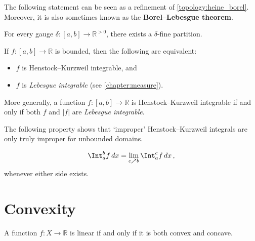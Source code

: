     The following statement can be seen as a refinement of \cref{topology:heine_borel}. Moreover, it is also sometimes known as the \textbf{Borel--Lebesgue theorem}.
    \begin{property}[Cousin]
        For every gauge $\delta:[a,b]\rightarrow\mathbb{R}^{>0}$, there exists a $\delta$-fine partition. 
    \end{property}

    \begin{property}[Integrability]
        If $f:[a,b]\rightarrow\mathbb{R}$ is bounded, then the following are equivalent:
        \begin{itemize}
            \item $f$ is Henstock--Kurzweil integrable, and
            \item $f$ is \textit{Lebesgue integrable} (see \cref{chapter:measure}).
        \end{itemize}
        More generally, a function $f:[a,b]\rightarrow\mathbb{R}$ is Henstock--Kurzweil integrable if and only if both $f$ and $|f|$ are \textit{Lebesgue integrable}.
    \end{property}

    The following property shows that `improper' Henstock--Kurzweil integrals are only truly improper for unbounded domains.
    \begin{property}[Hake]
        \begin{gather}
            \Int_a^bf\,dx = \lim_{c\nearrow b}\Int_a^cf\,dx\,,
        \end{gather}
        whenever either side exists.
    \end{property}

\section{Convexity}


    \begin{definition}
        A function $f:X\rightarrow\mathbb{R}$ is linear if and only if it is both convex and concave.
    \end{definition}

